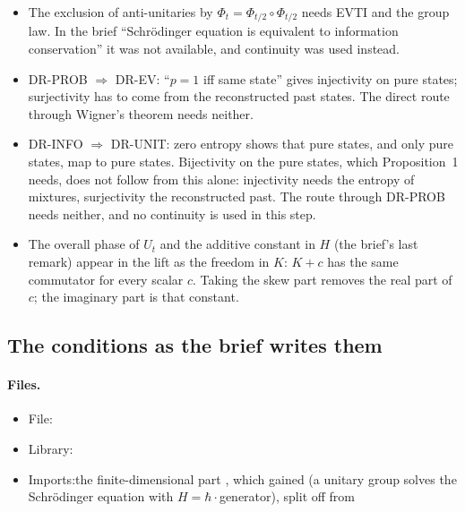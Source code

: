 \documentclass[11pt]{article}
\begin{document}
\begin{itemize}
  (Bargmann's theorem for $\mathbb{R}$) that the brief does not prove. In finite dimension it is
  avoided by working with the phase-free maps $A_t = U_t(\cdot)U_t^\dagger$ on
  $\mathrm{End}(E)$: they form a norm-continuous group on $\mathbb{R}$ (the pure states span
  $\mathrm{End}(E)$), so $A_t = \exp(tL)$ in $\mathrm{End}(\mathrm{End}(E))$. $L$ is a
  $*$-derivation, every derivation of $\mathrm{End}(E)$ is inner, $L = [K, \cdot\,]$, and the
  skew part $K_0 = \tfrac12(K - K^\dagger)$ has the same commutator. Then $V_t = \exp(tK_0)$ is
  the required unitary group, and $A_t = V_t(\cdot)V_t^\dagger$.
\item The exclusion of anti-unitaries by $\Phi_t = \Phi_{t/2} \circ \Phi_{t/2}$ needs EVTI and
  the group law. In the brief ``Schr\"odinger equation is equivalent to information
  conservation'' it was not available, and continuity was used instead.
\item DR-PROB $\Rightarrow$ DR-EV: ``$p = 1$ iff same state'' gives injectivity on pure states;
  surjectivity has to come from the reconstructed past states. The direct route through Wigner's
  theorem needs neither.
\item DR-INFO $\Rightarrow$ DR-UNIT: zero entropy shows that pure states, and only pure states,
  map to pure states. Bijectivity on the pure states, which Proposition~1 needs, does not follow
  from this alone: injectivity needs the entropy of mixtures, surjectivity the reconstructed past.
  The route through DR-PROB needs neither, and no continuity is used in this step.
\item The overall phase of $U_t$ and the additive constant in $H$ (the brief's last remark) appear
  in the lift as the freedom in $K$: $K + c$ has the same commutator for every scalar $c$.
  Taking the skew part removes the real part of $c$; the imaginary part is that constant.
\end{itemize}

\subsection{The conditions as the brief writes them}\label{sec:schroedinger-evolution-two-parameter}

\paragraph{Files.}\leavevmode
\begin{itemize}
\item File: 
\item Library: 
\item Imports:\newline the finite-dimensional part , which gained
   (a unitary group solves the Schr\"odinger equation
  with $H = \hbar\cdot$generator), split off from 
\end{itemize}
\end{document}
